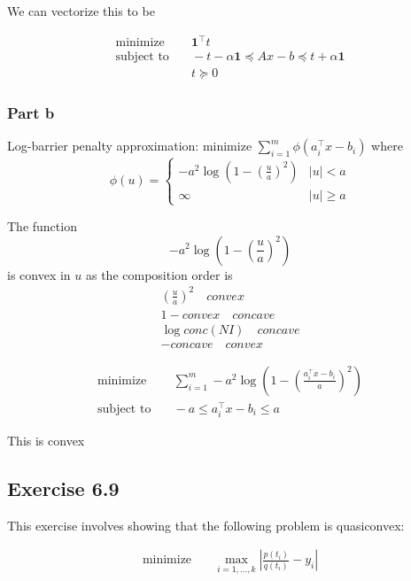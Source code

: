 We can vectorize this to be

\begin{align}
  \text{minimize} & \quad \textbf{1}^\top t \\
  \text{subject to} & \quad -t - \alpha \textbf{1} \preceq Ax - b \preceq  t + \alpha \textbf{1} \\
  & \quad t \succeq 0
\end{align}

\subsubsection{Part b}
Log-barrier penalty approximation: minimize $\sum_{i=1}^{m} \phi(a_i^\top x - b_i)$ where
\begin{equation}
    \phi(u) = \begin{cases}
        -a^2 \log (1- (\frac{u}{a})^2) & |u| < a \\
        \infty & |u| \geq a
    \end{cases}
\end{equation}

The function
\begin{equation}
    -a^2 \log (1- (\frac{u}{a})^2)
\end{equation}
is convex in $u$ as the composition order is 
\begin{gather}
    (\frac{u}{a})^2 \quad convex \\
    1- convex \quad concave \\
    \log conc(NI) \quad concave \\
    - concave \quad convex
\end{gather}

\begin{align}
  \text{minimize} & \quad \sum_{i=1}^{m} -a^2 \log(1- (\frac{a_i^\top x - b_i}{a})^2) \\
  \text{subject to} & \quad -a \leq a_i^\top x - b_i \leq a 
\end{align}

This is convex




\subsection{Exercise 6.9}
This exercise involves showing that the following problem is quasiconvex:

\begin{align}
  \text{minimize} & \quad \max_{i=1,\dots,k} |\frac{p(t_i)}{q(t_i)} - y_i|
\end{align}

